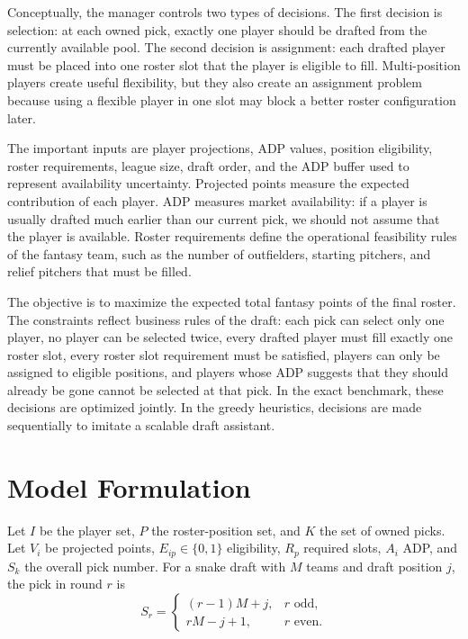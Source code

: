 \documentclass[12pt]{article}
\begin{document}
Conceptually, the manager controls two types of decisions. The first decision is selection: at each owned pick, exactly one player should be drafted from the currently available pool. The second decision is assignment: each drafted player must be placed into one roster slot that the player is eligible to fill. Multi-position players create useful flexibility, but they also create an assignment problem because using a flexible player in one slot may block a better roster configuration later.

The important inputs are player projections, ADP values, position eligibility, roster requirements, league size, draft order, and the ADP buffer used to represent availability uncertainty. Projected points measure the expected contribution of each player. ADP measures market availability: if a player is usually drafted much earlier than our current pick, we should not assume that the player is available. Roster requirements define the operational feasibility rules of the fantasy team, such as the number of outfielders, starting pitchers, and relief pitchers that must be filled.

The objective is to maximize the expected total fantasy points of the final roster. The constraints reflect business rules of the draft: each pick can select only one player, no player can be selected twice, every drafted player must fill exactly one roster slot, every roster slot requirement must be satisfied, players can only be assigned to eligible positions, and players whose ADP suggests that they should already be gone cannot be selected at that pick. In the exact benchmark, these decisions are optimized jointly. In the greedy heuristics, decisions are made sequentially to imitate a scalable draft assistant.

\section{Model Formulation}
Let \(I\) be the player set, \(P\) the roster-position set, and \(K\) the set of owned picks. Let \(V_i\) be projected points, \(E_{ip}\in\{0,1\}\) eligibility, \(R_p\) required slots, \(A_i\) ADP, and \(S_k\) the overall pick number. For a snake draft with \(M\) teams and draft position \(j\), the pick in round \(r\) is
\[
S_r =
\begin{cases}
(r-1)M+j, & r \text{ odd},\\
rM-j+1, & r \text{ even}.
\end{cases}
\]
\end{document}
